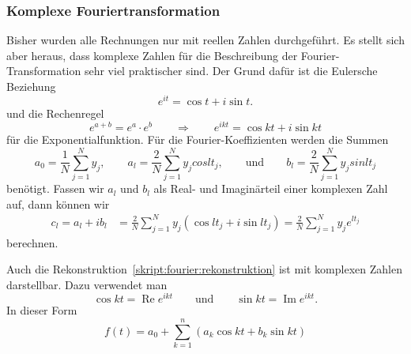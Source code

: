 %
%
%
\subsubsection{Komplexe Fouriertransformation}
Bisher wurden alle Rechnungen nur mit reellen Zahlen durchgeführt.
Es stellt sich aber heraus, dass komplexe Zahlen für die Beschreibung
der Fourier-Transformation sehr viel praktischer sind.
Der Grund dafür ist die Eulersche Beziehung
\[
e^{it} = \cos t + i \sin t.
\]
und die Rechenregel
\[
e^{a+b}=e^a\cdot e^b
\qquad\Rightarrow\qquad
e^{ikt}=\cos kt+i\sin kt
\]
für die Exponentialfunktion.
Für die Fourier-Koeffizienten werden die Summen
\[
a_0
=
\frac{1}{N}\sum_{j=1}^N y_j,\qquad
a_l
=
\frac{2}{N}\sum_{j=1}^N y_j cos lt_j,
\qquad\text{und}\qquad
b_l
=
\frac{2}{N}\sum_{j=1}^N y_j sin lt_j
\]
benötigt.
Fassen wir $a_l$ und $b_l$ als Real- und Imaginärteil einer komplexen
Zahl auf, dann können wir 
\begin{align*}
c_l
=
a_l+ib_l
&=
\frac2{N} \sum_{j=1}^N y_j (\cos lt_j + i \sin lt_j)
=
\frac2{N} \sum_{j=1}^N y_j e^{lt_j}
\end{align*}
berechnen.

Auch die Rekonstruktion~\eqref{skript:fourier:rekonstruktion} ist
mit komplexen Zahlen darstellbar.
Dazu verwendet man 
\[
\cos kt = \operatorname{Re} e^{ikt}
\qquad\text{und}\qquad
\sin kt = \operatorname{Im} e^{ikt}.
\]
In dieser Form
\[
f(t)
=
a_0
+\sum_{k=1}^n (a_k \cos kt + b_k \sin kt)
\]




